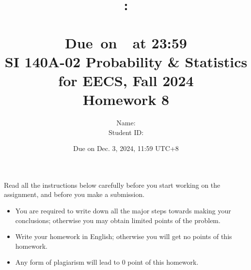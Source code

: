 \documentclass[a4paper]{article}
\title{
    \vspace{2in}
    \textmd{\textbf{\hmwkClass:\\  \hmwkTitle}}\\
    \normalsize\vspace{0.1in}\small{Due\ on\ \hmwkDueDate\ at 23:59}\\
	\vspace{4in}
}
\author{
	Name: \textbf{\hmwkAuthorName} \\
	Student ID: \hmwkAuthorID}
\date{}
\begin{document}

\date{
Due on Dec. 3, 2024, 11:59 UTC+8}
\title{SI 140A-02  Probability \& Statistics for EECS, Fall 2024 \\
Homework 8}
\maketitle
Read all the instructions below carefully before you start working on the assignment, and before you make a submission.
\begin{itemize}
    \item You are required to write down all the major steps towards making your conclusions; otherwise you may obtain limited points of the problem.
    \item Write your homework in English; otherwise you will get no points of this homework.
    \item Any form of plagiarism will lead to $0$ point of this homework. 
\end{itemize}
\newpage
\end{document}
